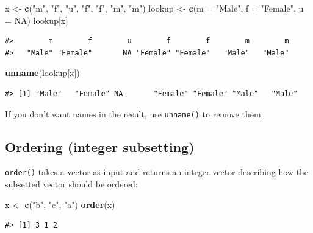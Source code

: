 \documentclass[]{book}
\newenvironment{Shaded}{\begin{snugshade}}{\end{snugshade}}
\newcommand{\KeywordTok}[1]{\textcolor[rgb]{0.13,0.29,0.53}{\textbf{#1}}}
\newcommand{\DataTypeTok}[1]{\textcolor[rgb]{0.13,0.29,0.53}{#1}}
\newcommand{\StringTok}[1]{\textcolor[rgb]{0.31,0.60,0.02}{#1}}
\newcommand{\OtherTok}[1]{\textcolor[rgb]{0.56,0.35,0.01}{#1}}
\newcommand{\NormalTok}[1]{#1}
\theoremstyle{definition}
\theoremstyle{definition}
\theoremstyle{definition}
\theoremstyle{remark}
\begin{document}
\begin{Shaded}
\begin{Highlighting}[]
\NormalTok{x <-}\StringTok{ }\KeywordTok{c}\NormalTok{(}\StringTok{"m"}\NormalTok{, }\StringTok{"f"}\NormalTok{, }\StringTok{"u"}\NormalTok{, }\StringTok{"f"}\NormalTok{, }\StringTok{"f"}\NormalTok{, }\StringTok{"m"}\NormalTok{, }\StringTok{"m"}\NormalTok{)}
\NormalTok{lookup <-}\StringTok{ }\KeywordTok{c}\NormalTok{(}\DataTypeTok{m =} \StringTok{"Male"}\NormalTok{, }\DataTypeTok{f =} \StringTok{"Female"}\NormalTok{, }\DataTypeTok{u =} \OtherTok{NA}\NormalTok{)}
\NormalTok{lookup[x]}
\end{Highlighting}
\end{Shaded}

\begin{verbatim}
#>        m        f        u        f        f        m        m 
#>   "Male" "Female"       NA "Female" "Female"   "Male"   "Male"
\end{verbatim}

\begin{Shaded}
\begin{Highlighting}[]
\KeywordTok{unname}\NormalTok{(lookup[x])}
\end{Highlighting}
\end{Shaded}

\begin{verbatim}
#> [1] "Male"   "Female" NA       "Female" "Female" "Male"   "Male"
\end{verbatim}

If you don't want names in the result, use \texttt{unname()} to remove
them.

\subsection{Ordering (integer
subsetting)}\label{ordering-integer-subsetting}

\texttt{order()} takes a vector as input and returns an integer vector
describing how the subsetted vector should be ordered:

\begin{Shaded}
\begin{Highlighting}[]
\NormalTok{x <-}\StringTok{ }\KeywordTok{c}\NormalTok{(}\StringTok{"b"}\NormalTok{, }\StringTok{"c"}\NormalTok{, }\StringTok{"a"}\NormalTok{)}
\KeywordTok{order}\NormalTok{(x)}
\end{Highlighting}
\end{Shaded}

\begin{verbatim}
#> [1] 3 1 2
\end{verbatim}
\end{document}
